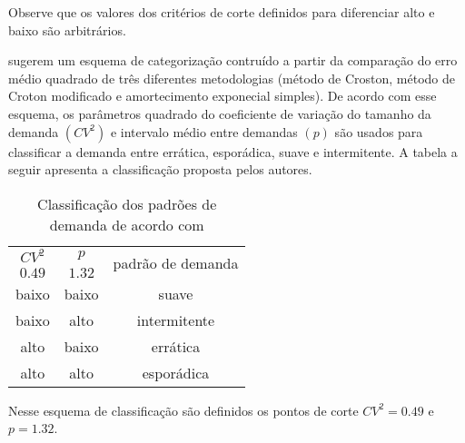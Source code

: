 \documentclass{book}
\begin{document}
Observe que os valores dos critérios de corte definidos para diferenciar alto e baixo são arbitrários.

\cite{SyntetosEtAl2005} sugerem um esquema de categorização contruído a partir da comparação do erro médio quadrado de três diferentes metodologias (método de Croston, método de Croton modificado e amortecimento exponecial simples). De acordo com esse esquema, os parâmetros quadrado do coeficiente de variação do tamanho da demanda $(CV^2)$ e intervalo médio entre demandas $(p)$ são usados para classificar a demanda entre errática, esporádica, suave e intermitente. A tabela a seguir apresenta a classificação proposta pelos autores.

\begin{table}[h]
\begin{center}
\begin{tabular}[c]{c c c}
\cline {1-3}
$CV^2$ & $p$ & \multirow{2}{*}{padrão de demanda} \\ 
$0.49$ & $1.32$ & \\ \cline {1-3}
baixo & baixo & suave   \\ 
baixo & alto  & intermitente   \\ 
alto  & baixo & errática   \\
alto  & alto  & esporádica  \\ \cline {1-3}
\end{tabular}
\caption{Classificação dos padrões de demanda de acordo com \cite{SyntetosEtAl2005}}
\label{tab:DemandPatternSybtetos}
\end{center}
\end{table}

Nesse esquema de classificação são definidos os pontos de corte $CV^2=0.49$ e $p=1.32$.
\end{document}

